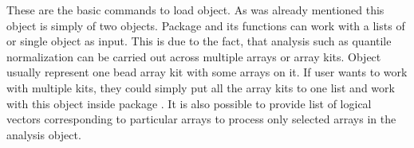 These are the basic commands to load  object. As was already mentioned this object is simply  of two  objects. Package  and its functions can work with a lists of  or single  object as input. This is due to the fact, that analysis such as quantile normalization can be carried out across multiple arrays or array kits. Object  usually represent one bead array kit with some arrays on it. If user wants to work with multiple kits, they could simply put all the array kits to one list and work with this object inside package . It is also possible to provide list of logical vectors corresponding to particular arrays to process only selected arrays in the analysis object.

